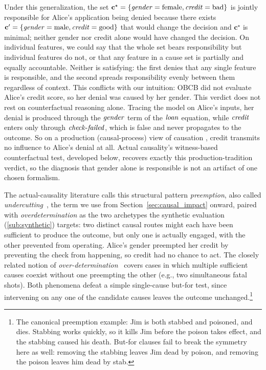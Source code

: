 Under this generalization, the set  $\mathbf{c}^\star = \{\varname{gender}=\text{female}, \varname{credit}=\text{bad}\}$
 is jointly responsible for Alice's application being denied because 
 there exists $\mathbf{c}' = \{\varname{gender}=\text{male}, \varname{credit}=\text{good}\}$ that would change the decision
and $\mathbf{c}^\star$ is minimal; neither gender nor credit alone would have changed the decision. On individual features, we could say that the whole set bears responsibility but individual features do not, or that any feature in a cause set is partially and equally accountable.
Neither is satisfying: the first denies that any single feature is responsible, and the second spreads responsibility evenly between them regardless of context.
This conflicts with our intuition: OBCB did not evaluate Alice’s credit score, so her denial was caused by her gender.
This verdict does not rest on counterfactual reasoning alone. Tracing the model on Alice's inputs, her denial is produced through the $\varname{gender}$ term of the $\varname{loan}$ equation, while $\varname{credit}$ enters only through $\varname{check\text{-}failed}$, which is false and never propagates to the outcome. So on a production (causal-process) view of causation \citep{hall2004two}, credit transmits no influence to Alice's denial at all.
Actual causality's witness-based counterfactual test, developed below, recovers exactly this production-tradition verdict, so the diagnosis that gender alone is responsible is not an artifact of one chosen formalism.

The actual-causality literature calls this structural pattern \emph{preemption}, also called \emph{undercutting}~\citep{lewis1973causation,
actualCausalityHalpern}, the term we use from
Section~\ref{sec:causal_impact} onward, paired with \emph{overdetermination} as
the two archetypes the synthetic evaluation (\cref{sub:synthetic}) targets: two
distinct causal routes
might each have been sufficient to produce the outcome, but only one is actually
engaged, with the other prevented from operating.
Alice's gender preempted her credit by preventing the check from happening, so
credit had no chance to act.
The closely related notion of \emph{over-determination}~\citep{paulhall2013,
actualCausalityHalpern} covers cases in which
multiple sufficient causes coexist without one preempting the other (e.g., two
simultaneous fatal shots).
Both phenomena defeat a simple single-cause but-for test, since intervening on any one of the
candidate causes leaves the outcome unchanged.\footnote{
The canonical preemption example: Jim is both stabbed and poisoned, and dies.
Stabbing works quickly, so it kills Jim before the poison takes effect, and the
stabbing caused his death.
But-for clauses fail to break the symmetry here as well: removing the stabbing
leaves Jim dead by poison, and removing the poison leaves him dead by stab.
}

